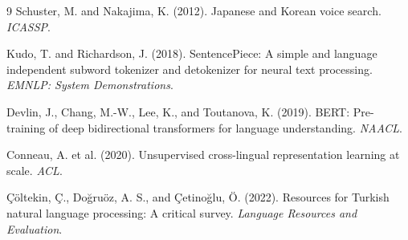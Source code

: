 \documentclass[11pt]{article}
\begin{document}
\begin{thebibliography}{9}
Schuster, M. and Nakajima, K. (2012). Japanese and Korean voice search. \emph{ICASSP}.

Kudo, T. and Richardson, J. (2018). SentencePiece: A simple and language independent subword tokenizer and detokenizer for neural text processing. \emph{EMNLP: System Demonstrations}.

Devlin, J., Chang, M.-W., Lee, K., and Toutanova, K. (2019). BERT: Pre-training of deep bidirectional transformers for language understanding. \emph{NAACL}.

Conneau, A. et al. (2020). Unsupervised cross-lingual representation learning at scale. \emph{ACL}.

Çöltekin, Ç., Doğruöz, A. S., and Çetinoğlu, Ö. (2022). Resources for Turkish natural language processing: A critical survey. \emph{Language Resources and Evaluation}.
\end{thebibliography}
\end{document}
